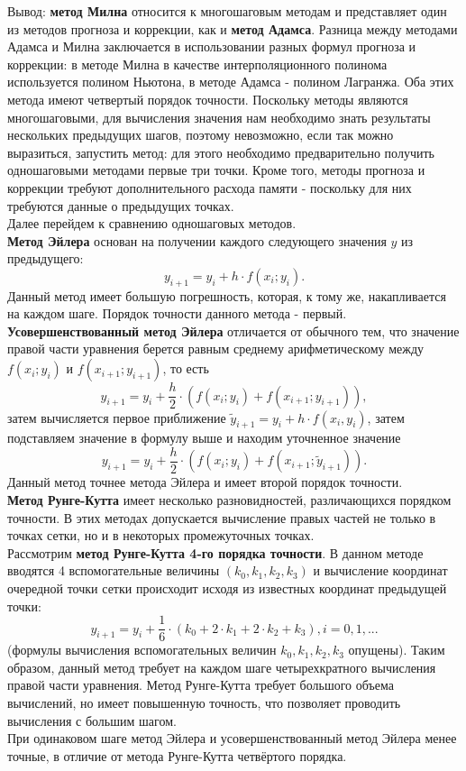 \newpage
Вывод: 
\textbf{метод Милна} относится к многошаговым методам и представляет один из методов прогноза и коррекции, как и \textbf{метод Адамса}. Разница между методами Адамса и Милна заключается в использовании разных формул прогноза и коррекции: в методе Милна в качестве интерполяционного полинома используется полином Ньютона, в методе Адамса - полином Лагранжа. Оба этих метода имеют четвертый порядок точности. Поскольку методы являются многошаговыми, для вычисления значения нам необходимо знать результаты нескольких предыдущих шагов, поэтому невозможно, если так можно выразиться, запустить метод: для этого необходимо предварительно получить одношаговыми методами первые три точки. Кроме того, методы прогноза и коррекции требуют  дополнительного расхода памяти - поскольку для них требуются данные о предыдущих точках. \\ 
Далее перейдем к сравнению одношаговых методов. \\
\textbf{Метод Эйлера} основан на получении каждого следующего значения $y$ из предыдущего: $$y_{i+1}=y_i+h\cdot f(x_i;y_i). $$ 
Данный метод имеет большую погрешность, которая, к тому же, накапливается на каждом шаге. Порядок точности данного метода - первый. \\
\textbf{Усовершенствованный метод Эйлера} отличается от обычного тем, что значение правой части уравнения берется равным среднему арифметическому между $f(x_i;y_i)$ и $f(x_{i+1};y_{i+1})$, то есть
$$y_{i+1}=y_i+\frac{h}{2} \cdot (f(x_i;y_i)+f(x_{i+1};y_{i+1})),$$
затем вычисляется первое приближение $\widetilde{y}_{i+1} = y_i+h \cdot f(x_i,y_i)$, затем подставляем значение в формулу выше и находим уточненное значение 
$$y_{i+1}=y_i+\frac{h}{2} \cdot (f(x_i;y_i)+f(x_{i+1};\widetilde{y}_{i+1})).$$ 
Данный метод точнее метода Эйлера и имеет второй порядок точности. \\
\textbf{Метод Рунге-Кутта} имеет несколько разновидностей, различающихся порядком точности. В этих методах допускается вычисление правых частей не только в точках сетки, но и в некоторых промежуточных точках. \\
Рассмотрим \textbf{метод Рунге-Кутта 4-го порядка точности}. В данном методе вводятся 4 вспомогательные величины $(k_0, k_1, k_2, k_3)$ и вычисление координат очередной точки сетки происходит исходя из известных координат предыдущей точки: $$y_{i+1}=y_i+ \frac{1}{6} \cdot (k_0+2\cdot k_1+2 \cdot k_2+k_3) , i = 0, 1, ... $$ (формулы вычисления вспомогательных величин $k_0, k_1, k_2, k_3$ опущены). Таким образом, данный метод требует на каждом шаге четырехкратного вычисления правой части уравнения. Метод Рунге-Кутта требует большого объема вычислений, но имеет повышенную точность, что позволяет проводить вычисления с большим шагом.\\
\newline
При одинаковом шаге метод Эйлера и усовершенствованный метод Эйлера менее точные, в отличие от метода Рунге-Кутта четвёртого порядка. \\